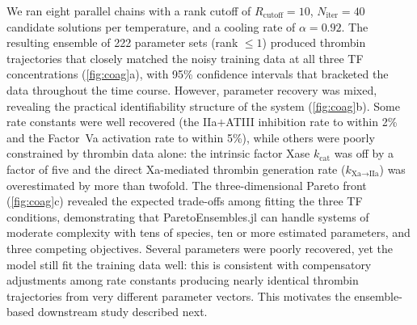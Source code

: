 \documentclass[12pt]{article}
\begin{document}
We ran eight parallel chains with a rank cutoff of $R_{\text{cutoff}} = 10$, $N_{\text{iter}} = 40$ candidate solutions per temperature, and a cooling rate of $\alpha = 0.92$. The resulting ensemble of 222 parameter sets (rank $\leq 1$) produced thrombin trajectories that closely matched the noisy training data at all three TF concentrations (\cref{fig:coag}a), with 95\% confidence intervals that bracketed the data throughout the time course. However, parameter recovery was mixed, revealing the practical identifiability structure of the system (\cref{fig:coag}b). Some rate constants were well recovered (the IIa$+$ATIII inhibition rate to within 2\% and the Factor~Va activation rate to within 5\%), while others were poorly constrained by thrombin data alone: the intrinsic factor Xase $k_{\text{cat}}$ was off by a factor of five and the direct Xa-mediated thrombin generation rate ($k_{\text{Xa} \to \text{IIa}}$) was overestimated by more than twofold. The three-dimensional Pareto front (\cref{fig:coag}c) revealed the expected trade-offs among fitting the three TF conditions, demonstrating that ParetoEnsembles.jl can handle systems of moderate complexity with tens of species, ten or more estimated parameters, and three competing objectives. Several parameters were poorly recovered, yet the model still fit the training data well: this is consistent with compensatory adjustments among rate constants producing nearly identical thrombin trajectories from very different parameter vectors. This motivates the ensemble-based downstream study described next.
\end{document}
